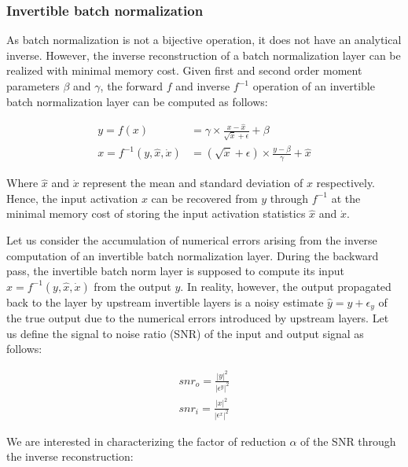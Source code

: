 \documentclass[twocolumn]{bmcart}
\begin{document}
\subsubsection{Invertible batch normalization}

As batch normalization is not a bijective operation, it does not have an analytical inverse.
However, the inverse reconstruction of a batch normalization layer can be realized with minimal memory cost.
Given first and second order moment parameters $\beta$ and $\gamma$, the forward $f$ and inverse $f^{-1}$ operation of an invertible batch normalization layer can be computed as follows:

\begin{subequations}
\begin{align}
y = f(x) &= \gamma \times \frac{x - \hat{x}}{\sqrt{\dot{x}} + \epsilon} + \beta \\
x = f^{-1}(y, \hat{x}, \dot{x}) &= (\sqrt{\dot{x}} + \epsilon) \times \frac{y -  \beta}{\gamma}  + \hat{x}
\end{align}
\end{subequations}

Where $\hat{x}$ and $\dot{x}$ represent the mean and standard deviation of $x$ respectively.
Hence, the input activation $x$ can be recovered from $y$ through $f^{-1}$ at the minimal memory cost of storing the input activation statistics $\hat{x}$ and $\dot{x}$.

Let us consider the accumulation of numerical errors arising from the inverse computation of an invertible batch normalization layer.
During the backward pass, the invertible batch norm layer is supposed to compute its input $x=f^{-1}(y, \hat{x}, \dot{x})$ from the output $y$.
In reality, however, the output propagated back to the layer by upstream invertible layers is a noisy estimate $\hat{y}=y+\epsilon_y$ of the true output due to the numerical errors introduced by upstream layers.
Let us define the signal to noise ratio (SNR) of the input and output signal as follows:

\begin{subequations}
\begin{align}
snr_o = \frac{|y|^2}{|\epsilon^y|^2} \\
snr_i = \frac{|x|^2}{|\epsilon^x|^2}  
\end{align}
\end{subequations}

We are interested in characterizing the factor of reduction $\alpha$ of the SNR through the inverse reconstruction:
\end{document}
